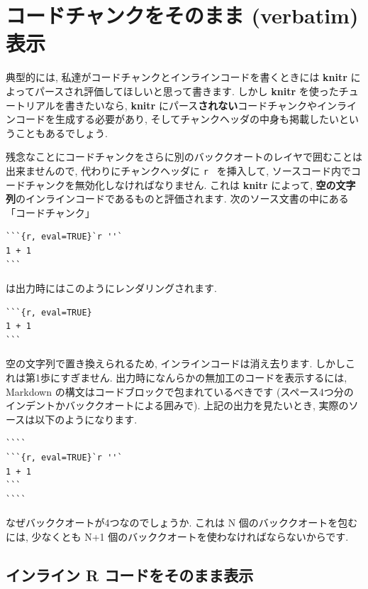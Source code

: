 \documentclass[
  11pt,
  lualatex,
  ja=standard]{bxjsreport}
\begin{document}
\hypertarget{verbatim-code-chunks}{%
\section{コードチャンクをそのまま (verbatim) 表示}\label{verbatim-code-chunks}}

典型的には, 私達がコードチャンクとインラインコードを書くときには \textbf{knitr} によってパースされ評価してほしいと思って書きます. しかし \textbf{knitr} を使ったチュートリアルを書きたいなら, \textbf{knitr} にパース\textbf{されない}コードチャンクやインラインコードを生成する必要があり, そしてチャンクヘッダの中身も掲載したいということもあるでしょう.

残念なことにコードチャンクをさらに別のバッククオートのレイヤで囲むことは出来ませんので, 代わりにチャンクヘッダに \texttt{\textasciigrave{}r\ \textquotesingle{}\textquotesingle{}\textasciigrave{}} を挿入して, ソースコード内でコードチャンクを無効化しなければなりません. これは \textbf{knitr} によって, \textbf{空の文字列}のインラインコードであるものと評価されます. 次のソース文書の中にある「コードチャンク」

\begin{verbatim}
```{r, eval=TRUE}`r ''`
1 + 1
```
\end{verbatim}

は出力時にはこのようにレンダリングされます.

\begin{verbatim}
```{r, eval=TRUE}
1 + 1
```
\end{verbatim}

空の文字列で置き換えられるため, インラインコードは消え去ります. しかしこれは第1歩にすぎません. 出力時になんらかの無加工のコードを表示するには, Markdown の構文はコードブロックで包まれているべきです (スペース4つ分のインデントかバッククオートによる囲みで). 上記の出力を見たいとき, 実際のソースは以下のようになります.

\begin{verbatim}
````
```{r, eval=TRUE}`r ''`
1 + 1
```
````
\end{verbatim}

なぜバッククオートが4つなのでしょうか. これは N 個のバッククオートを包むには, 少なくとも N+1 個のバッククオートを使わなければならないからです.

\hypertarget{show-a-verbatim-inline-expression}{%
\subsection{インライン R コードをそのまま表示}\label{show-a-verbatim-inline-expression}}
\end{document}
